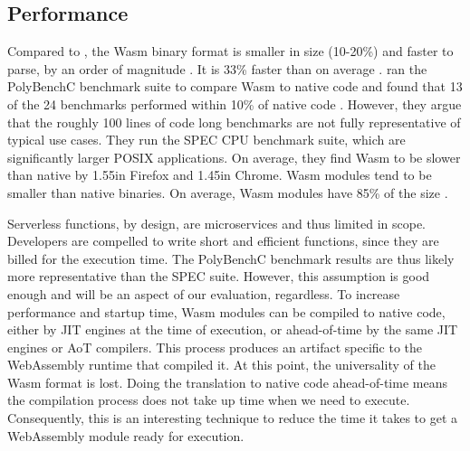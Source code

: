 \subsection{Performance}

Compared to , the Wasm binary format is smaller in size (10-20\%) and faster to parse, by an order of magnitude
\cite{Clark2019}. It is 33\% faster than  on average \cite{Haas2017}.
\citeauthor{NotSoFast} ran the PolyBenchC benchmark suite to compare Wasm to native code and found that 13 of the 24 benchmarks performed within 10\% of native code \cite{NotSoFast}. However, they argue that the roughly 100 lines of code long benchmarks are not fully representative of typical use cases. They run the SPEC CPU benchmark suite, which are significantly larger POSIX applications. On average, they find Wasm to be slower than native by 1.55\times in Firefox and 1.45\times in Chrome.
Wasm modules tend to be smaller than native  binaries. On average, Wasm modules have 85\% of the size \cite{Haas2017}.

Serverless functions, by design, are microservices and thus limited in scope. Developers are compelled to write short and efficient functions, since they are billed for the execution time. The PolyBenchC benchmark results are thus likely more representative than the SPEC suite. However, this assumption is good enough and will be an aspect of our evaluation, regardless.
To increase performance and startup time, Wasm modules can be compiled to native code, either by JIT engines at the time of execution, or ahead-of-time by the same JIT engines or AoT compilers. This process produces an artifact specific to the WebAssembly runtime that compiled it. At this point, the universality of the Wasm format is lost. Doing the translation to native code ahead-of-time means the compilation process does not take up time when we need to execute. Consequently, this is an interesting technique to reduce the time it takes to get a WebAssembly module ready for execution.




